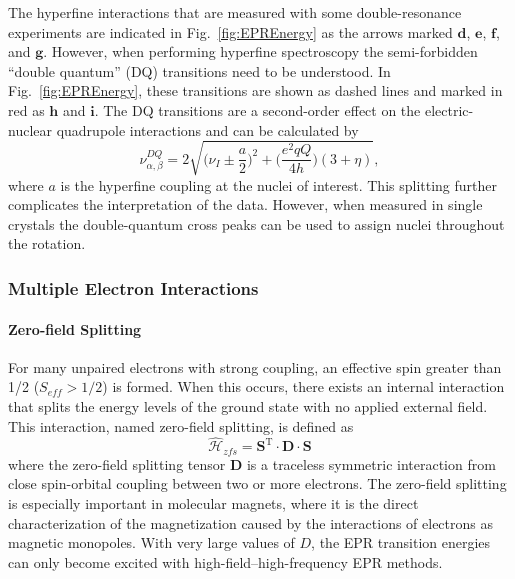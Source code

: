 The hyperfine interactions that are measured with some double-resonance experiments are indicated in Fig.~\ref{fig:EPREnergy} as the arrows marked $\mathbf{d}$, $\mathbf{e}$, $\mathbf{f}$, and $\mathbf{g}$. However, when performing hyperfine spectroscopy the semi-forbidden ``double quantum'' (DQ) transitions need to be understood. In Fig.~\ref{fig:EPREnergy}, these transitions are shown as dashed lines and marked in red as $\mathbf{h}$ and $\mathbf{i}$. The DQ transitions are a second-order effect on the electric-nuclear quadrupole interactions and can be calculated by
\begin{equation}
\nu^{DQ}_{\alpha, \beta} = 2 \sqrt{\bigg(\nu_I \pm \frac{a}{2}\bigg)^2+\bigg(\frac{e^2 q Q}{4 h}\bigg)(3+\eta)}, \label{eq-2:doubleQ}
\end{equation}
where $a$ is the hyperfine coupling at the nuclei of interest. \cite{Doorslaer2007} This splitting further complicates the interpretation of the data. However, when measured in single crystals the double-quantum cross peaks can be used to assign nuclei throughout the rotation.

\subsubsection*{Multiple Electron Interactions}
\paragraph*{Zero-field Splitting}
For many unpaired electrons with strong coupling, an effective spin greater than 1/2 ($S_{eff} > 1/2$) is formed. When this occurs, there exists an internal interaction that splits the energy levels of the ground state with no applied external field. This interaction, named zero-field splitting, is defined as 
\begin{equation}
    \hat{\mathcal{H}}_{zfs} = \mathbf{S}^{\text{T} } \cdot \mathbf{D} \cdot \mathbf{S}
\end{equation}
where the zero-field splitting tensor $\mathbf{D}$ is a traceless symmetric interaction from close spin-orbital coupling between two or more electrons. The zero-field splitting is especially important in molecular magnets, where it is the direct characterization of the magnetization caused by the interactions of electrons as magnetic monopoles. \cite{barra1998high} With very large values of $D$, the EPR transition energies can only become excited with high-field--high-frequency EPR methods. \cite{Nehrkorn13} 

